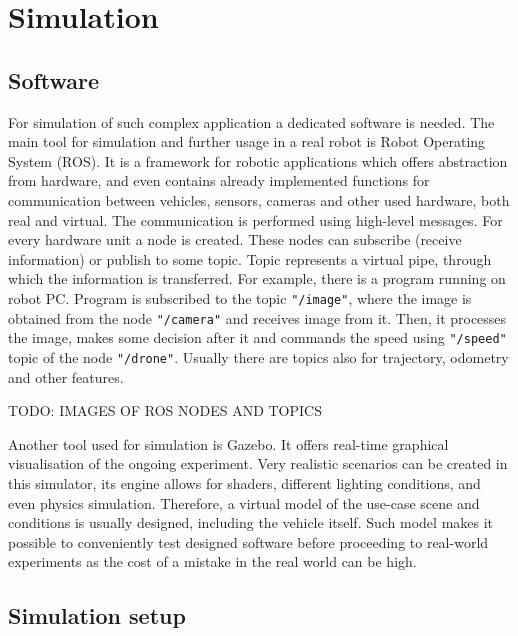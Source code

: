 \chapter{Simulation}



\section{Software}

For simulation of such complex application a dedicated software is needed. The main tool for simulation and further usage in a real robot is Robot Operating System (ROS). It is a framework for robotic applications which offers abstraction from hardware, and even contains already implemented functions for communication between vehicles, sensors, cameras and other used hardware, both real and virtual. 
The communication is performed using high-level messages. For every hardware unit a node is created. These nodes can subscribe (receive information) or publish to some topic. Topic represents a virtual pipe, through which the information is transferred. For example, there is a program running on robot PC. Program is subscribed to the topic \texttt{"/image"}, where the image is obtained from the node \texttt{"/camera"} and receives image from it. Then, it processes the image, makes some decision after it and commands the speed using \texttt{"/speed"} topic of the node \texttt{"/drone"}. Usually there are topics also for trajectory, odometry and other features.

TODO: IMAGES OF ROS NODES AND TOPICS

Another tool used for simulation is Gazebo. It offers real-time graphical visualisation of the ongoing experiment. Very realistic scenarios can be created in this simulator, its engine allows for shaders, different lighting conditions, and even physics simulation. Therefore, a virtual model of the use-case scene and conditions is usually designed, including the vehicle itself. Such model makes it possible to conveniently test designed software before proceeding to real-world experiments as the cost of a mistake in the real world can be high. 

\section{Simulation setup}

